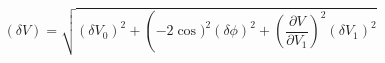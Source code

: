 \begin{equation}
\label{eq:delta_V_Malus}
\left(\delta V\right) = \sqrt{ (\delta V_0)^2 + \left(-2\cos)^2 (\delta \phi)^2 + \left( \frac{\partial{V}}{\partial{V_1}}\right)^2 (\delta V_1)^2}
\end{equation}